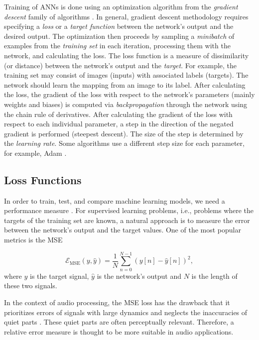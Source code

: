 Training of \acp{ANN} is done using an optimization algorithm from the \emph{gradient descent} family of algorithms \cite{Goodfellow-et-al-2016}. In general, gradient descent methodology requires specifying a \emph{loss} or a \emph{target function} between the network's output and the desired output. The optimization then proceeds by sampling a \emph{minibatch} of examples from the \emph{training set} in each iteration, processing them with the network, and calculating the loss. The loss function is a measure of dissimilarity (or distance) between the network's output and the \emph{target}. For example, the training set may consist of images (inputs) with associated labels (targets). The network should learn the mapping from an image to its label. After calculating the loss, the gradient of the loss with respect to the network's parameters (mainly weights and biases) is computed via \emph{backpropagation} through the network using the chain rule of derivatives. After calculating the gradient of the loss with respect to each individual parameter, a step in the direction of the negated gradient is performed (steepest descent). The size of the step is determined by the \emph{learning rate}. Some algorithms use a different step size for each parameter, for example, Adam \cite{Kingma2017}.

\subsection*{Loss Functions}
\label{sec:loss_functions}

In order to train, test, and compare machine learning models, we need a performance measure \cite{Goodfellow-et-al-2016}. For supervised learning problems, i.e., problems where the targets of the training set are known, a natural approach is to measure the error between the network's output and the target values. One of the most popular metrics is the \ac{MSE}

\begin{equation}
  \mathcal{E}_\text{MSE}(y, \hat{y}) = \frac{1}{N} \sum \limits_{n=0}^{N-1} (y[n] - \hat{y}[n])^2,
\end{equation}
where $y$ is the target signal, $\hat{y}$ is the network's output and $N$ is the length of these two signals.

In the context of audio processing, the \ac{MSE} loss has the drawback that it prioritizes errors of signals with large dynamics and neglects the inaccuracies of quiet parts \cite{Parker2019}. These quiet parts are often perceptually relevant. Therefore, a relative error measure is thought to be more suitable in audio applications.

